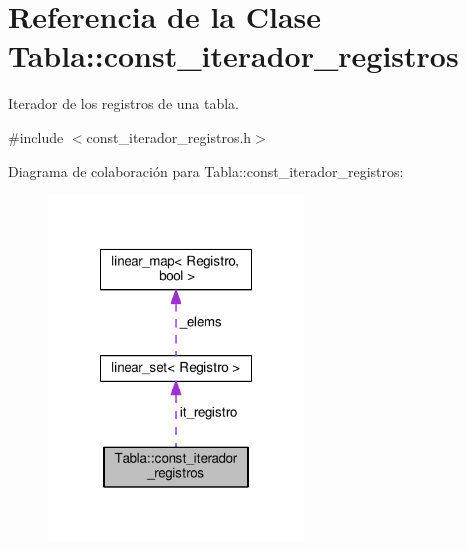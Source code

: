 \hypertarget{classTabla_1_1const__iterador__registros}{\section{Referencia de la Clase Tabla\-:\-:const\-\_\-iterador\-\_\-registros}
\label{classTabla_1_1const__iterador__registros}
}


Iterador de los registros de una tabla.  




{\ttfamily \#include $<$const\-\_\-iterador\-\_\-registros.\-h$>$}



Diagrama de colaboración para Tabla\-:\-:const\-\_\-iterador\-\_\-registros\-:\nopagebreak
\begin{figure}[H]
\begin{center}
\leavevmode
\includegraphics[width=192pt]{classTabla_1_1const__iterador__registros__coll__graph}
\end{center}
\end{figure}
